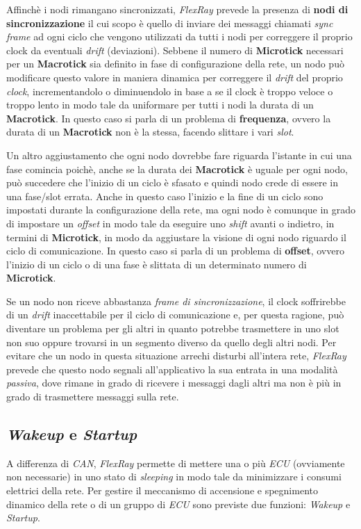 Affinchè i nodi rimangano sincronizzati, \emph{FlexRay} prevede la presenza di \textbf{nodi di sincronizzazione} il cui scopo è quello di inviare dei messaggi chiamati \emph{sync frame} ad ogni ciclo che vengono utilizzati da tutti i nodi per correggere il proprio clock da eventuali \emph{drift} (deviazioni). Sebbene il numero di \textbf{Microtick} necessari per un \textbf{Macrotick} sia definito in fase di configurazione della rete, un nodo può modificare questo valore in maniera dinamica per correggere il \emph{drift} del proprio \emph{clock}, incrementandolo o diminuendolo in base a se il clock è troppo veloce o troppo lento \cite{eos_flexray} in modo tale da uniformare per tutti i nodi la durata di un \textbf{Macrotick}. In questo caso si parla di un problema di \textbf{frequenza}, ovvero la durata di un \textbf{Macrotick} non è la stessa, facendo slittare i vari \emph{slot}. \cite{flexray_specification} \cite{nxp_flexray}

Un altro aggiustamento che ogni nodo dovrebbe fare riguarda l'istante in cui una fase comincia poichè, anche se la durata dei \textbf{Macrotick} è uguale per ogni nodo, può succedere che l'inizio di un ciclo è sfasato e quindi nodo crede di essere in una fase/slot errata. Anche in questo caso l'inizio e la fine di un ciclo sono impostati durante la configurazione della rete, ma ogni nodo è comunque in grado di impostare un \emph{offset} in modo tale da eseguire uno \emph{shift} avanti o indietro, in termini di \textbf{Microtick}, in modo da aggiustare la visione di ogni nodo riguardo il ciclo di comunicazione. In questo caso si parla di un problema di \textbf{offset}, ovvero l'inizio di un ciclo o di una fase è slittata di un determinato numero di \textbf{Microtick}. \cite{flexray_specification} \cite{nxp_flexray}

Se un nodo non riceve abbastanza \emph{frame di sincronizzazione}, il clock soffrirebbe di un \emph{drift} inaccettabile per il ciclo di comunicazione e, per questa ragione, può diventare un problema per gli altri in quanto potrebbe trasmettere in uno slot non suo oppure trovarsi in un segmento diverso da quello degli altri nodi. Per evitare che un nodo in questa situazione arrechi disturbi all'intera rete, \emph{FlexRay} prevede che questo nodo segnali all'applicativo la sua entrata in una modalità \emph{passiva}, dove rimane in grado di ricevere i messaggi dagli altri ma non è più in grado di trasmettere messaggi sulla rete. \cite{eos_flexray}

\subsection{\emph{Wakeup} e \emph{Startup}}
A differenza di \emph{CAN}, \emph{FlexRay} permette di mettere una o più \emph{ECU} (ovviamente non necessarie) in uno stato di \emph{sleeping} in modo tale da minimizzare i consumi elettrici della rete. Per gestire il meccanismo di accensione e spegnimento dinamico della rete o di un gruppo di \emph{ECU} sono previste due funzioni: \emph{Wakeup} e \emph{Startup}.

